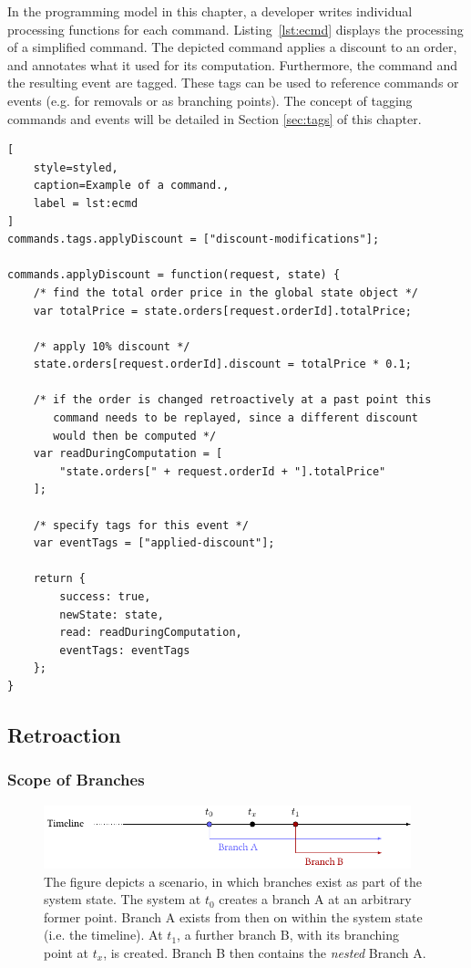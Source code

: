 In the programming model in this chapter, a developer writes individual processing 
functions for each command. \mbox{Listing \ref{lst:ecmd}} displays the processing 
of a simplified command. The depicted command applies a discount to an order, and 
annotates what it used for its computation. 
Furthermore, the command and the resulting event are tagged. These tags can be 
used to reference commands or events (e.g. for removals or as branching points).
The concept of tagging commands and events will be detailed in Section \ref{sec:tags} 
of this chapter.

\begin{lstlisting}[
	style=styled, 
	caption=Example of a command.,
	label = lst:ecmd
]
commands.tags.applyDiscount = ["discount-modifications"];

commands.applyDiscount = function(request, state) {
	/* find the total order price in the global state object */
	var totalPrice = state.orders[request.orderId].totalPrice;

	/* apply 10% discount */
	state.orders[request.orderId].discount = totalPrice * 0.1;

	/* if the order is changed retroactively at a past point this 
	   command needs to be replayed, since a different discount 
	   would then be computed */
	var readDuringComputation = [ 
		"state.orders[" + request.orderId + "].totalPrice"
	];

	/* specify tags for this event */
	var eventTags = ["applied-discount"];

	return {
		success: true,
		newState: state,
		read: readDuringComputation, 
		eventTags: eventTags
	};
}
\end{lstlisting}


\subsection{Retroaction}

\subsubsection{Scope of Branches}
\begin{figure}
	\centering
	\includegraphics[width=0.95\textwidth]{../illustrations/nested-branches.pdf}
	\caption{
		The figure depicts a scenario, in which branches exist as part of the system state.
		The system at $t_0$ creates a branch A at an arbitrary former point. Branch A
		exists from then on within the system state (i.e. the timeline). At $t_1$, a 
		further branch B, with its branching point at $t_x$, is created. 
		Branch B then contains the \emph{nested} Branch A.
	}
	\label{fig:nested-branches}
\end{figure}

